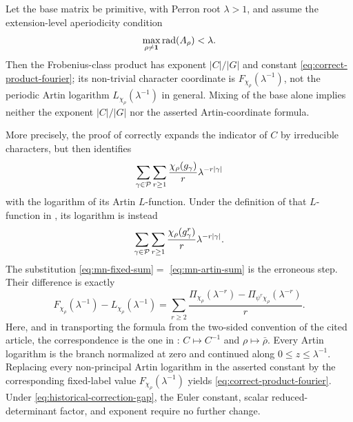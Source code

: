 \begin{theorem}
\label{thm:formal-correction}
Let the base matrix be primitive, with Perron root \(\lambda>1\), and assume
the extension-level aperiodicity condition
\begin{equation}\label{eq:historical-correction-gap}
 \max_{\rho\ne\mathbf1}\operatorname{rad}(A_\rho)<\lambda.
\end{equation}
Then the Frobenius-class product has exponent \(|C|/|G|\) and constant
\eqref{eq:correct-product-fourier}; its non-trivial character coordinate is
\(F_{\chi_\rho}(\lambda^{-1})\), not the periodic Artin logarithm
\(L_{\chi_\rho}(\lambda^{-1})\) in general.  Mixing of the base alone implies
neither the exponent \(|C|/|G|\) nor the asserted Artin-coordinate formula.

More precisely, the proof of
\cite[Theorem~1, pp.~124--125]{MeslizaNoorani1999FrobeniusMertens}
correctly expands the indicator of \(C\) by irreducible characters, but then
identifies
\begin{equation}\label{eq:mn-fixed-sum}
  \sum_{\gamma\in\mathcal P}\sum_{r\geq1}
     \frac{\chi_\rho(g_\gamma)}{r}
       \lambda^{-r|\gamma|}
\end{equation}
with the logarithm of its Artin \(L\)-function.  Under the definition of that
\(L\)-function in
\cite[p.~121]{MeslizaNoorani1999FrobeniusMertens}, its logarithm is instead
\begin{equation}\label{eq:mn-artin-sum}
  \sum_{\gamma\in\mathcal P}\sum_{r\geq1}
     \frac{\chi_\rho(g_\gamma^r)}{r}
       \lambda^{-r|\gamma|}.
\end{equation}
The substitution \eqref{eq:mn-fixed-sum}\(={}\)
\eqref{eq:mn-artin-sum} is the erroneous step.  Their difference is exactly
\begin{equation}\label{eq:mn-correction-difference}
  F_{\chi_\rho}(\lambda^{-1})-L_{\chi_\rho}(\lambda^{-1})
  =\sum_{r\geq2}\frac{
    \Pi_{\chi_\rho}(\lambda^{-r})-
    \Pi_{\psi^r\chi_\rho}(\lambda^{-r})}{r}.
\end{equation}
Here, and in transporting the formula from the two-sided convention of the
cited article, the correspondence is the one in
: \(C\mapsto C^{-1}\) and
\(\rho\mapsto\bar\rho\).  Every Artin logarithm is the branch normalized at
zero and continued along \(0\le z\le\lambda^{-1}\).  Replacing every
non-principal Artin logarithm in the asserted constant by
the corresponding fixed-label value \(F_{\chi_\rho}(\lambda^{-1})\) yields
\eqref{eq:correct-product-fourier}.  Under
\eqref{eq:historical-correction-gap}, the Euler constant, scalar
reduced-determinant factor, and exponent require no further change.
\end{theorem}

